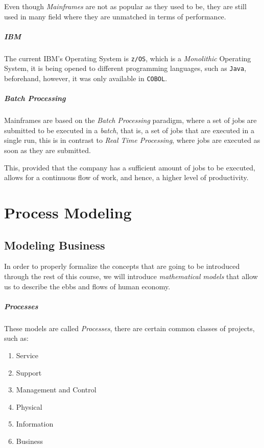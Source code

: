 \documentclass[openright, twoside, twocolumn, a4paper, 10pt]{report}
\begin{document}
Even though \emph{Mainframes} are not as popular as they used to be, they are still used in many
field where they are unmatched in terms of performance.

\paragraph{IBM}

The current IBM's Operating System is \texttt{z/OS}, which is a \emph{Monolithic} Operating System,
it is being opened to different programming languages, such as \texttt{Java}, beforehand, however,
it was only available in \texttt{COBOL}.

\paragraph{Batch Processing}

Mainframes are based on the \emph{Batch Processing} paradigm, where a set of jobs are submitted to
be executed in a \emph{batch}, that is, a set of jobs that are executed in a single run, this is
in contrast to \emph{Real Time Processing}, where jobs are executed as soon as they are submitted.

This, provided that the company has a sufficient amount of jobs to be executed, allows for a continuous
flow of work, and hence, a higher level of productivity.

\chapter{Process Modeling}

\section{Modeling Business}

In order to properly formalize the concepts that are going to be introduced through the rest
of this course, we will introduce \emph{mathematical models} that allow us to describe the
ebbs and flows of human economy.

\paragraph{Processes}
These models are called \emph{Processes}, there are certain common classes of projects, such as:

\begin{enumerate}
	\item Service
	\item Support
	\item Management and Control
	\item Physical
	\item Information
	\item Business
\end{enumerate}
\end{document}
